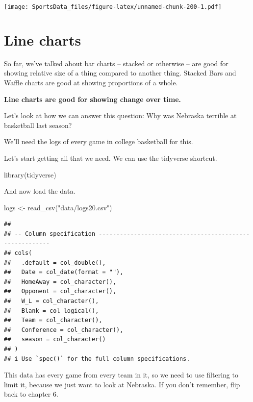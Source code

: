 \documentclass[
]{book}
\newenvironment{Shaded}{\begin{snugshade}}{\end{snugshade}}
\newcommand{\FunctionTok}[1]{\textcolor[rgb]{0.00,0.00,0.00}{#1}}
\newcommand{\NormalTok}[1]{#1}
\newcommand{\OtherTok}[1]{\textcolor[rgb]{0.56,0.35,0.01}{#1}}
\newcommand{\StringTok}[1]{\textcolor[rgb]{0.31,0.60,0.02}{#1}}
\begin{document}
\texttt{[image: SportsData\_files/figure-latex/unnamed-chunk-200-1.pdf]}

\hypertarget{line-charts}{%
\chapter{Line charts}\label{line-charts}}

So far, we've talked about bar charts -- stacked or otherwise -- are good for showing relative size of a thing compared to another thing. Stacked Bars and Waffle charts are good at showing proportions of a whole.

\textbf{Line charts are good for showing change over time.}

Let's look at how we can answer this question: Why was Nebraska terrible at basketball last season?

We'll need the logs of every game in college basketball for this.

Let's start getting all that we need. We can use the tidyverse shortcut.

\begin{Shaded}
\begin{Highlighting}[]
\FunctionTok{library}\NormalTok{(tidyverse)}
\end{Highlighting}
\end{Shaded}

And now load the data.

\begin{Shaded}
\begin{Highlighting}[]
\NormalTok{logs }\OtherTok{\textless{}{-}} \FunctionTok{read\_csv}\NormalTok{(}\StringTok{"data/logs20.csv"}\NormalTok{)}
\end{Highlighting}
\end{Shaded}

\begin{verbatim}
## 
## -- Column specification --------------------------------------------------------
## cols(
##   .default = col_double(),
##   Date = col_date(format = ""),
##   HomeAway = col_character(),
##   Opponent = col_character(),
##   W_L = col_character(),
##   Blank = col_logical(),
##   Team = col_character(),
##   Conference = col_character(),
##   season = col_character()
## )
## i Use `spec()` for the full column specifications.
\end{verbatim}

This data has every game from every team in it, so we need to use filtering to limit it, because we just want to look at Nebraska. If you don't remember, flip back to chapter 6.
\end{document}
